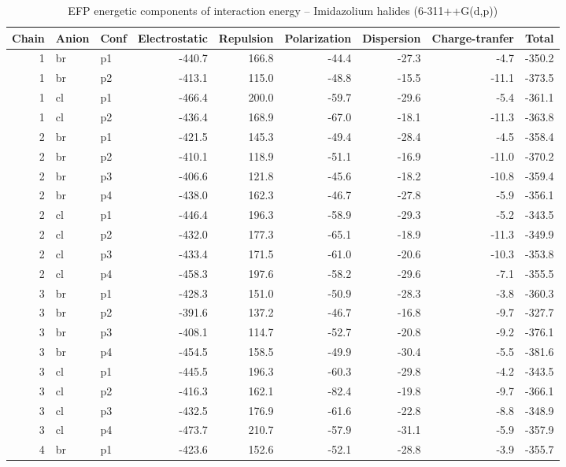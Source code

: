 \documentclass[a4paper]{article}
\begin{document}
\begin{table}[ht]
\centering
\footnotesize
\caption{EFP energetic components of interaction energy -- Imidazolium halides (6-311++G(d,p))}
\begin{tabular}{rllrrrrrr}
  \hline
Chain & Anion & Conf & Electrostatic & Repulsion & Polarization & Dispersion & Charge-tranfer & Total \\ 
  \hline
 1 & br & p1 & -440.7 & 166.8 & -44.4 & -27.3 & -4.7 & -350.2 \\ 
   1 & br & p2 & -413.1 & 115.0 & -48.8 & -15.5 & -11.1 & -373.5 \\ 
   1 & cl & p1 & -466.4 & 200.0 & -59.7 & -29.6 & -5.4 & -361.1 \\ 
   1 & cl & p2 & -436.4 & 168.9 & -67.0 & -18.1 & -11.3 & -363.8 \\ 
   2 & br & p1 & -421.5 & 145.3 & -49.4 & -28.4 & -4.5 & -358.4 \\ 
   2 & br & p2 & -410.1 & 118.9 & -51.1 & -16.9 & -11.0 & -370.2 \\ 
   2 & br & p3 & -406.6 & 121.8 & -45.6 & -18.2 & -10.8 & -359.4 \\ 
   2 & br & p4 & -438.0 & 162.3 & -46.7 & -27.8 & -5.9 & -356.1 \\ 
   2 & cl & p1 & -446.4 & 196.3 & -58.9 & -29.3 & -5.2 & -343.5 \\ 
   2 & cl & p2 & -432.0 & 177.3 & -65.1 & -18.9 & -11.3 & -349.9 \\ 
   2 & cl & p3 & -433.4 & 171.5 & -61.0 & -20.6 & -10.3 & -353.8 \\ 
   2 & cl & p4 & -458.3 & 197.6 & -58.2 & -29.6 & -7.1 & -355.5 \\ 
   3 & br & p1 & -428.3 & 151.0 & -50.9 & -28.3 & -3.8 & -360.3 \\ 
   3 & br & p2 & -391.6 & 137.2 & -46.7 & -16.8 & -9.7 & -327.7 \\ 
   3 & br & p3 & -408.1 & 114.7 & -52.7 & -20.8 & -9.2 & -376.1 \\ 
   3 & br & p4 & -454.5 & 158.5 & -49.9 & -30.4 & -5.5 & -381.6 \\ 
   3 & cl & p1 & -445.5 & 196.3 & -60.3 & -29.8 & -4.2 & -343.5 \\ 
   3 & cl & p2 & -416.3 & 162.1 & -82.4 & -19.8 & -9.7 & -366.1 \\ 
   3 & cl & p3 & -432.5 & 176.9 & -61.6 & -22.8 & -8.8 & -348.9 \\ 
   3 & cl & p4 & -473.7 & 210.7 & -57.9 & -31.1 & -5.9 & -357.9 \\ 
   4 & br & p1 & -423.6 & 152.6 & -52.1 & -28.8 & -3.9 & -355.7 \\ 

\end{tabular}
\end{table}
\end{document}
